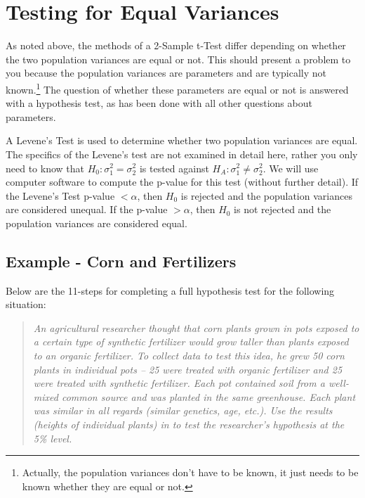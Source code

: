 \documentclass[10pt,openany]{book}\usepackage[]{graphicx}\usepackage[]{color}
\begin{document}
\newpage
\section{Testing for Equal Variances}\label{sect:LevenesTest}
As noted above, the methods of a 2-Sample t-Test differ depending on whether the two population variances are equal or not. This should present a problem to you because the population variances are parameters and are typically not known.\footnote{Actually, the population variances don't have to be known, it just needs to be known whether they are equal or not.} The question of whether these parameters are equal or not is answered with a hypothesis test, as has been done with all other questions about parameters.

A Levene's Test is used to determine whether two population variances are equal. The specifics of the Levene's test are not examined in detail here, rather you only need to know that $H_{0}:\sigma_{1}^{2}=\sigma_{2}^{2}$ is tested against $H_{A}:\sigma_{1}^{2}\neq\sigma_{2}^{2}$. We will use computer software to compute the p-value for this test (without further detail). If the Levene's Test p-value $< \alpha$, then $H_{0}$ is rejected and the population variances are considered unequal. If the p-value $> \alpha$, then $H_{0}$ is not rejected and the population variances are considered equal.


\subsection{Example - Corn and Fertilizers}
Below are the 11-steps  for completing a full hypothesis test for the following situation:
\vspace{-4pt}
\begin{quote}
\textsl{An agricultural researcher thought that corn plants grown in pots exposed to a certain type of synthetic fertilizer would grow taller than plants exposed to an organic fertilizer. To collect data to test this idea, he grew 50 corn plants in individual pots -- 25 were treated with organic fertilizer and 25 were treated with synthetic fertilizer. Each pot contained soil from a well-mixed common source and was planted in the same greenhouse. Each plant was similar in all regards (similar genetics, age, etc.). Use the results (heights of individual plants) in  to test the researcher's hypothesis at the 5\% level.}
\end{quote}
\end{document}

